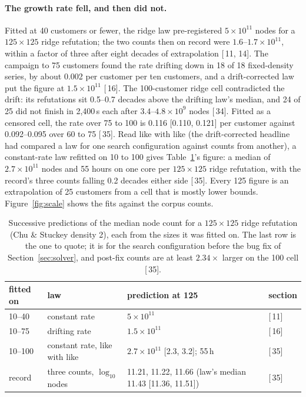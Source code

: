 \documentclass[11pt,a4paper]{article}
\renewcommand{\S}[1]{[\textsection\,#1]}
\begin{document}
\paragraph{The growth rate fell, and then did not.}
Fitted at 40 customers or fewer, the ridge law pre-registered $5 \times
10^{11}$ nodes for a $125 \times 125$ ridge refutation; the two counts then on
record were $1.6$--$1.7 \times 10^{11}$, within a factor of three after eight
decades of extrapolation \S{11, 14}. The campaign to 75 customers found the
rate drifting down in 18 of 18 fixed-density series, by about 0.002 per
customer per ten customers, and a drift-corrected law put the figure at
$1.5 \times 10^{11}$ \S{16}. The 100-customer ridge cell contradicted the
drift: its refutations sit 0.5--0.7 decades above the drifting law's median,
and 24 of 25 did not finish in 2,400\,s each after $3.4$--$4.8 \times 10^9$
nodes \S{34}. Fitted as a censored cell, the rate over 75 to 100 is 0.116
[0.110, 0.121] per customer against 0.092--0.095 over 60 to 75 \S{35}. Read
like with like (the drift-corrected headline had compared a law for one
search configuration against counts from another), a constant-rate law
refitted on 10 to 100 gives Table~\ref{tab:rate}'s figure: a median of
$2.7 \times 10^{11}$ nodes and 55 hours on one core per $125 \times 125$
ridge refutation, with the record's three counts falling 0.2 decades either
side \S{35}. Every 125 figure is an extrapolation of 25 customers from a cell
that is mostly lower bounds. Figure~\ref{fig:scale} shows the fits against
the corpus counts.

\begin{table}[t]
\centering
\small
\caption{Successive predictions of the median node count for a
$125 \times 125$ ridge refutation (Chu \& Stuckey density 2), each from the
sizes it was fitted on. The last row is the one to quote; it is for the
search configuration before the bug fix of Section~\ref{sec:solver}, and
post-fix counts are at least $2.34\times$ larger on the 100 cell \S{35}.}
\label{tab:rate}
\begin{tabular}{llll}
\toprule
fitted on & law & prediction at 125 & section \\
\midrule
10--40 & constant rate & $5 \times 10^{11}$ & \S{11} \\
10--75 & drifting rate & $1.5 \times 10^{11}$ & \S{16} \\
10--100 & constant rate, like with like & $2.7 \times 10^{11}$ [2.3, 3.2]; 55\,h & \S{35} \\
\midrule
record & three counts, $\log_{10}$ nodes & 11.21, 11.22, 11.66 (law's median 11.43 [11.36, 11.51]) & \S{35} \\
\bottomrule
\end{tabular}
\end{table}
\end{document}
